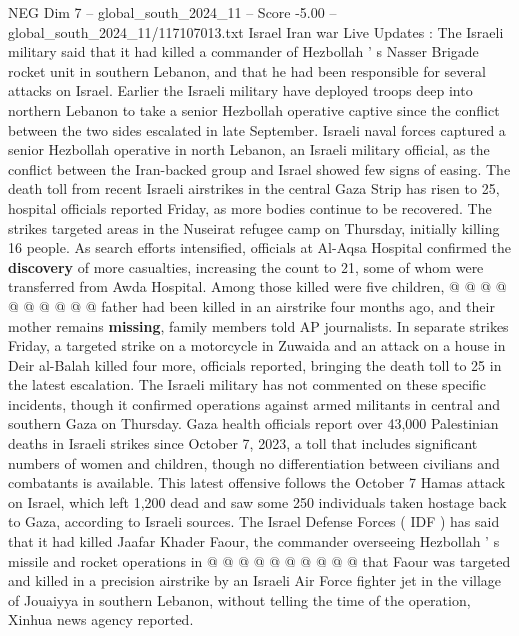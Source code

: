 \begin{textsample}{NEG Dim 7 – global\_south\_2024\_11 – Score -5.00 – global\_south\_2024\_11/117107013.txt}  \label{ex:f7_neg_435}
Israel Iran war Live Updates : The Israeli military said that it had killed a commander of Hezbollah ' s Nasser Brigade rocket unit in southern Lebanon, and that he had been responsible for several attacks on Israel.
Earlier the Israeli military have deployed troops deep into northern Lebanon to take a senior Hezbollah operative captive since the conflict between the two sides escalated in late September.
Israeli naval forces captured a senior Hezbollah operative in north Lebanon, an Israeli military official, as the conflict between the Iran-backed group and Israel showed few signs of easing.
The death toll from recent Israeli airstrikes in the central Gaza Strip has risen to 25, hospital officials reported Friday, as more bodies continue to be recovered.
The strikes targeted areas in the Nuseirat refugee camp on Thursday, initially killing 16 people.
As search efforts intensified, officials at Al-Aqsa Hospital confirmed the \textbf{discovery} of more casualties, increasing the count to 21, some of whom were transferred from Awda Hospital.
Among those killed were five children, @ @ @ @ @ @ @ @ @ @ father had been killed in an airstrike four months ago, and their mother remains \textbf{missing}, family members told AP journalists.
In separate strikes Friday, a targeted strike on a motorcycle in Zuwaida and an attack on a house in Deir al-Balah killed four more, officials reported, bringing the death toll to 25 in the latest escalation.
The Israeli military has not commented on these specific incidents, though it confirmed operations against armed militants in central and southern Gaza on Thursday.
Gaza health officials report over 43,000 Palestinian deaths in Israeli strikes since October 7, 2023, a toll that includes significant numbers of women and children, though no differentiation between civilians and combatants is available.
This latest offensive follows the October 7 Hamas attack on Israel, which left 1,200 dead and saw some 250 individuals taken hostage back to Gaza, according to Israeli sources.
The Israel Defense Forces ( IDF ) has said that it had killed Jaafar Khader Faour, the commander overseeing Hezbollah ' s missile and rocket operations in @ @ @ @ @ @ @ @ @ @ that Faour was targeted and killed in a precision airstrike by an Israeli Air Force fighter jet in the village of Jouaiyya in southern Lebanon, without telling the time of the operation, Xinhua news agency reported.

\end{textsample}
